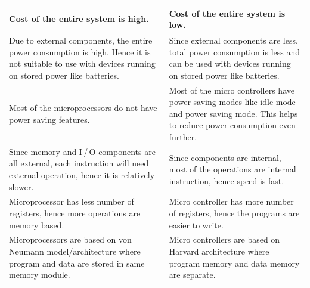{\begin{longtable}{|p{6.8cm}|p{6.8cm}|}
\hline
Cost of the entire system is high. & Cost of the entire system is low.\\
\hline
Due to external components, the entire power consumption is high. Hence it is not suitable to use with devices running on stored power like batteries. & Since external components are less, total power consumption is less and can be used with devices running on stored power like batteries.\\
\hline
Most of the microprocessors do not have power saving features. & Most of the micro controllers have power saving modes like idle mode and power saving mode. This helps to reduce power consumption even further.\\
\hline
Since memory and I\,/\,O components are all external, each instruction will need external operation, hence it is relatively slower. & Since components are internal, most of the operations are internal instruction, hence speed is fast.\\
\hline
Microprocessor has less number of registers, hence more operations are memory based. & Micro controller has more number of registers, hence the programs are easier to write.\\
\hline
Microprocessors are based on von Neumann model/architecture where program and data are stored in same memory module. & Micro controllers are based on Harvard architecture where program memory and data memory are separate.\\
\hline
\end{longtable}}
